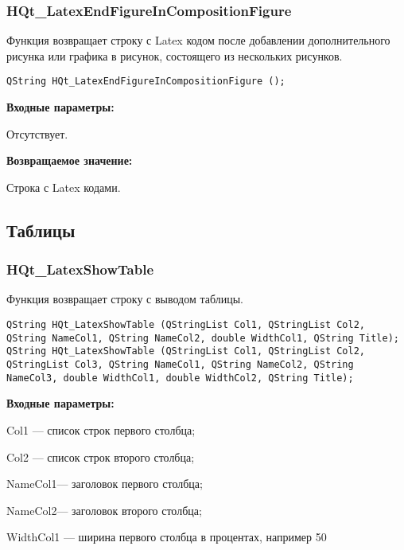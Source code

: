 \documentclass[a4paper,12pt]{article}
\begin{document}
\subsubsection{HQt\_LatexEndFigureInCompositionFigure}\label{HQt_LatexEndFigureInCompositionFigure}

Функция возвращает строку с Latex кодом после добавлении дополнительного рисунка или графика в рисунок, состоящего из нескольких рисунков.


\begin{lstlisting}[label=code_syntax_HQt_LatexEndFigureInCompositionFigure,caption=Синтаксис]
QString HQt_LatexEndFigureInCompositionFigure ();
\end{lstlisting}

\textbf{Входные параметры:}

Отсутствует.

\textbf{Возвращаемое значение:}

Строка с Latex кодами.


\subsection{Таблицы}

\subsubsection{HQt\_LatexShowTable}\label{HQt_LatexShowTable}

Функция возвращает строку с выводом таблицы.


\begin{lstlisting}[label=code_syntax_HQt_LatexShowTable,caption=Синтаксис]
QString HQt_LatexShowTable (QStringList Col1, QStringList Col2, QString NameCol1, QString NameCol2, double WidthCol1, QString Title);
QString HQt_LatexShowTable (QStringList Col1, QStringList Col2, QStringList Col3, QString NameCol1, QString NameCol2, QString NameCol3, double WidthCol1, double WidthCol2, QString Title);
\end{lstlisting}

\textbf{Входные параметры:}
 
    Col1 --- список строк первого столбца;
 
    Col2 --- список строк второго столбца;
 
    NameCol1--- заголовок первого столбца;
 
    NameCol2--- заголовок второго столбца;
 
    WidthCol1 --- ширина первого столбца в процентах, например 50%
 
\end{document}
